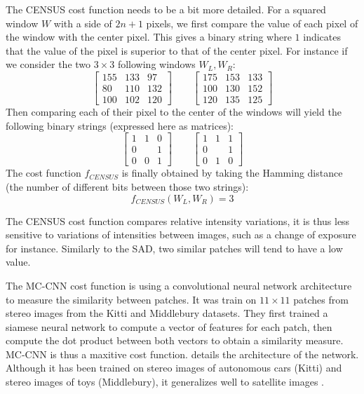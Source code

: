 \begin{example}
	The CENSUS cost function needs to be a bit more detailed. For a squared window $W$ with a side of $2n+1$ pixels, we first compare the value of each pixel of the window with the center pixel. This gives a binary string where $1$ indicates that the value of the pixel is superior to that of the center pixel. For instance if we consider the two $3\times3$ following windows $W_L, W_R$:
	$$
    \begin{bmatrix}
        155 & 133 & 97 \\
        80 & 110 & 132 \\
        100 & 102 & 120
    \end{bmatrix}
    \qquad
    \begin{bmatrix}
        175 & 153 & 133 \\
        100 & 130 & 152 \\
        120 & 135 & 125
    \end{bmatrix}
	$$
	Then comparing each of their pixel to the center of the windows will yield the following binary strings (expressed here as matrices):
	$$
    \begin{bmatrix}
        1 & 1 & 0 \\
        0 &  & 1 \\
        0 & 0 & 1
    \end{bmatrix}
    \qquad
    \begin{bmatrix}
        1 & 1 & 1 \\
        0 &  & 1 \\
        0 & 1 & 0
    \end{bmatrix}
	$$
	The cost function $f_{CENSUS}$ is finally obtained by taking the Hamming distance (\ie the number of different bits between those two strings):
	\begin{equation*}
		f_{CENSUS}(W_L, W_R) = 3
	\end{equation*}
	
	The CENSUS cost function compares relative intensity variations, it is thus less sensitive to variations of intensities between images, such as a change of exposure for instance. Similarly to the SAD, two similar patches will tend to have a low value.
	
	The MC-CNN cost function \cite{zbontar_stereo_2016} is using a convolutional neural network architecture to measure the similarity between patches. It was train on $11\times 11$ patches from stereo images from the Kitti \cite{geiger_vision_2013, menze_object_2015} and Middlebury \cite{scharstein_taxonomy_2001,scharstein_high-accuracy_2003,hirschmuller_evaluation_2007,scharstein_learning_2007,scharstein_high-resolution_2014} datasets. They first trained a siamese neural network to compute a vector of features for each patch, then compute the dot product between both vectors to obtain a similarity measure. MC-CNN is thus a maxitive cost function.  details the architecture of the network. Although it has been trained on stereo images of autonomous cars (Kitti) and stereo images of toys (Middlebury), it generalizes well to satellite images \cite{defonte_evaluation_2021}.
	

\end{example}
